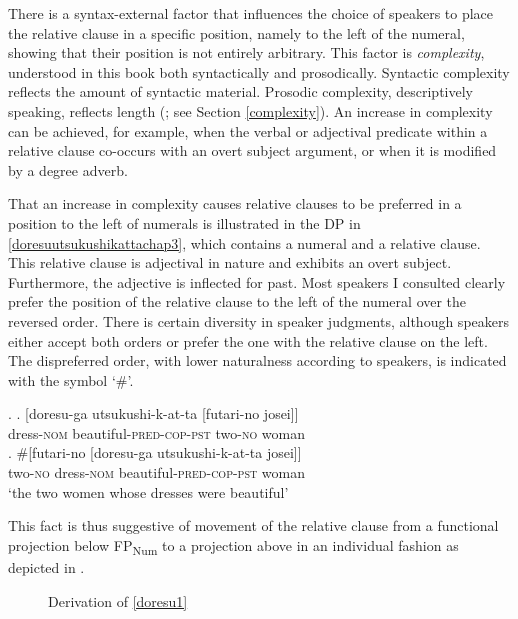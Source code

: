 There is a syntax-external factor that influences the choice of speakers to place the relative clause in a specific position, namely to the left of the numeral, showing that their position is not entirely arbitrary. This factor is \textit{complexity}, understood in this book both syntactically and prosodically. Syntactic complexity reflects the amount of syntactic material. Prosodic complexity, descriptively speaking, reflects length (\citealt{hawkins:2007:efficiency}; see Section \ref{complexity}). An increase in complexity can be achieved, for example, when the verbal or adjectival predicate within a relative clause co-occurs with an overt subject argument, or when it is modified by a degree adverb.

That an increase in complexity causes relative clauses to be preferred in a position to the left of numerals is illustrated in the DP in \ref{doresuutsukushikattachap3}, which contains a numeral and a relative clause. This relative clause is adjectival in nature and exhibits an overt subject. Furthermore, the adjective is inflected for past. Most speakers I consulted clearly prefer the position of the relative clause to the left of the numeral over the reversed order. There is certain diversity in speaker judgments, although speakers either accept both orders or prefer the one with the relative clause on the left. The dispreferred order, with lower naturalness according to speakers, is indicated with the symbol `\#’.

\ex. \label{doresuutsukushikattachap3} \ag. [doresu-ga utsukushi-k-at-ta [futari-no josei]]\\
dress-\textsc{nom} beautiful-\textsc{pred-cop-pst} two-\textsc{no} woman \label{doresu1}\\
\bg. \#[futari-no [doresu-ga utsukushi-k-at-ta josei]]\\
two-\textsc{no} dress-\textsc{nom} beautiful-\textsc{pred-cop-pst} woman\\
`the two women whose dresses were beautiful'

This fact is thus suggestive of movement of the relative clause from a functional projection below FP\textsubscript{Num} to a projection above in an individual fashion as depicted in .

\begin{figure}
\centering
{}
\caption{Derivation of \ref{doresu1}}
\label{Derivation doresu-ga utsukushi-katta futari-no josei}
\end{figure}

